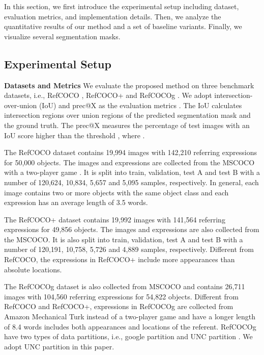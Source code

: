 In this section, we first introduce the experimental setup including dataset, evaluation metrics, and implementation details. Then, we analyze the quantitative results of our method and a set of baseline variants. Finally, we visualize several segmentation masks.

\subsection{Experimental Setup}
\textbf{Datasets and Metrics}
We evaluate the proposed method on three benchmark datasets, i.e., RefCOCO \cite{kazemzadeh2014referitgame}, RefCOCO+ \cite{kazemzadeh2014referitgame} and RefCOCOg \cite{mao2016generation}.
We adopt intersection-over-union (IoU) and prec@X as the evaluation metrics \cite{luo2020multi,ye2019cross}. The IoU calculates intersection regions over union regions of the predicted segmentation mask and the ground truth. The prec@X measures the percentage of test images with an IoU score higher than the threshold  , where .

The RefCOCO dataset contains 19,994 images with 142,210 referring expressions for 50,000 objects. The images and expressions are collected from the MSCOCO \cite{lin2014microsoft} with a two-player game \cite{kazemzadeh2014referitgame}. It is split into train, validation, test A and test B with a number of 120,624, 10,834, 5,657 and 5,095 samples, respectively. In general, each image contains two or more objects with the same object class and each expression has an average length of 3.5 words.

The RefCOCO+ dataset contains
19,992 images with 141,564 referring expressions for 49,856 objects. The images and expressions are also collected from the MSCOCO. It is also split into train, validation, test A and test B with a number of 120,191, 10,758, 5,726 and 4,889 samples, respectively. Different from RefCOCO, the expressions in RefCOCO+ include more appearances than absolute locations.

The RefCOCOg dataset is also collected from MSCOCO and contains 26,711 images with 104,560 referring expressions for 54,822 objects. Different from RefCOCO and RefCOCO+, expressions in RefCOCOg are collected from Amazon Mechanical Turk instead of a two-player game and have a longer length of 8.4 words includes both appearances and locations of the referent.
RefCOCOg \cite{mao2016generation,nagaraja2016modeling} have two types of data partitions, i.e., google partition \cite{mao2016generation} and UNC partition \cite{nagaraja2016modeling}. We adopt UNC partition in this paper.


